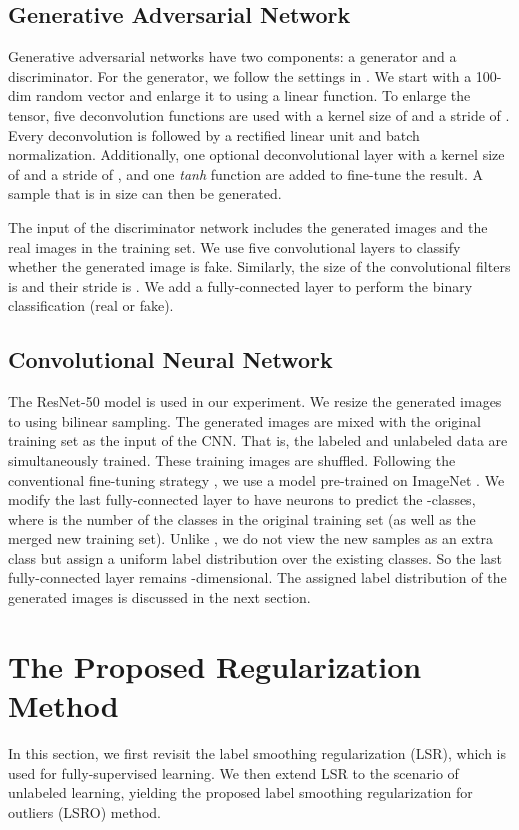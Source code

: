 \documentclass[10pt,twocolumn,letterpaper]{article}
\begin{document}
\subsection{Generative Adversarial Network}
Generative adversarial networks have two components: a generator and a discriminator. For the generator, we follow the settings in \cite{radford2015unsupervised}. We start with a 100-dim random vector and enlarge it to  using a linear function. To enlarge the tensor, five deconvolution functions are used with a kernel size of  and a stride of . Every deconvolution is followed by a rectified linear unit and batch normalization. Additionally, one optional deconvolutional layer with a kernel size of  and a stride of , and one \emph{tanh} function are added to fine-tune the result. A sample that is  in size can then be generated. 
 
The input of the discriminator network includes the generated images and the real images in the training set. We use five convolutional layers to classify whether the generated image is fake. Similarly, the size of the convolutional filters is  and their stride is . We add a fully-connected layer to perform the binary classification (real or fake).

\subsection{Convolutional Neural Network}
The ResNet-50 \cite{he2016deep} model is used in our experiment. We resize the generated images to  using bilinear sampling. The generated images are mixed with the original training set as the input of the CNN. That is, the labeled and unlabeled data are simultaneously trained. These training images are shuffled. Following the conventional fine-tuning strategy \cite{zheng2016survey}, we use a model pre-trained on ImageNet \cite{russakovsky2015imagenet}. We modify the last fully-connected layer to have  neurons to predict the -classes, where  is the number of the classes in the original training set (as well as the merged new training set). Unlike \cite{odena2016semi,salimans2016improved}, we do not view the new samples as an extra class but assign a uniform label distribution over the existing classes. So the last fully-connected layer remains -dimensional. The assigned label distribution of the generated images is discussed in the next section.

\section{The Proposed Regularization Method} \label{loss}
In this section, we first revisit the label smoothing regularization (LSR), which is used for fully-supervised learning. We then extend LSR to the scenario of unlabeled learning, yielding the proposed label smoothing regularization for outliers (LSRO) method. 
\end{document}
